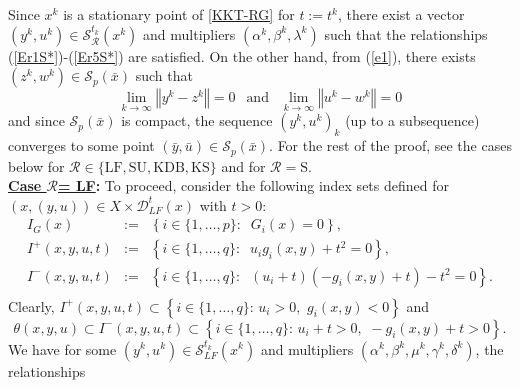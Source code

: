 Since $x^{k}$ is a stationary point of  \eqref{KKT-RG} for $t:=t^k$, there exist a vector
	$(y^{k},u^{k})\in\mathcal{S}_\mathcal{R}^{t_{k}}(x^{k})$ and multipliers $(\alpha
	^{k},\beta^{k},\lambda^{k})$ such that the relationships (\ref{Er1S*})-(\ref{Er5S*}) are satisfied. On the other hand, from (\ref{e1}), there exists $(z^{k},w^{k})\in
	\mathcal{S}_{p}(\bar{x})$ such that
\begin{equation}\label{Tr1-1}
    \underset{k \rightarrow
		\infty}{\lim }\left\Vert y^{k}-z^{k}\right\Vert = 0 \;\, \text{ and } \;\,\underset{k \rightarrow
		\infty}{\lim }\left\Vert
	u^{k}-w^{k}\right\Vert = 0
\end{equation}
	and since $\mathcal{S}_{p}(\bar{x})$ is compact, the sequence $(y^{k}
	,u^{k})_{k}$ (up to a subsequence) converges to some  point $(\bar{y},\bar
	{u})\in\mathcal{S}_{p}(\bar{x})$. For the rest of the proof, see the cases below for $\mathcal{R}\in \{\mbox{LF}, \mbox{SU}, \mbox{KDB}, \mbox{KS}\}$ and \cite{BNZ} for $\mathcal{R}=\mbox{S}$.\\[3ex]
\noindent \textbf{\underline{Case $ \mathcal{R}$= LF}:} To proceed, consider the following index sets defined for $(x,(y,u))\in X\times\mathcal{D}_{LF}^{t}(x)$ with $t>0$: 
\[
\begin{array}{rll}
I_{G}(x) & := & \left\{ i\in \{1,\ldots,p\}:\;\;G_{i}(x)=0\right\} , \\
I^{+}(x,y,u,t) & := & \left\{ i\in
\{1,\ldots,q\}:\;\;u_{i}g_{i}(x,y)+t^{2}=0\right\} , \\
I^{-}(x,y,u,t) & := & \left\{ i\in
\{1,\ldots,q\}:\;\;(u_{i}+t)(-g_{i}(x,y)+t)-t^{2}=0\right\}. \\
&  &
\end{array}
\]
Clearly,
$I^{+}(x,y,u,t)\subset \left\{ i\in
\{1,\ldots,q\}:\,u_{i}>0,\,\,g_{i}(x,y)<0\right\} $
and
$$\theta(x,y,u) \subset I^{-}(x,y,u,t)\subset
\left\{ i\in \{1,\ldots,q\}:\,u_{i}+t>0,\,\,-g_{i}(x,y)+t>0\right\}. $$
	We have for some $(y^{k},u^{k})\in\mathcal{S}_{LF}^{t_{k}}(x^{k})$ and multipliers $(\alpha
	^{k},\beta^{k},\mu^{k},\gamma^{k},\delta^{k})$, the relationships
